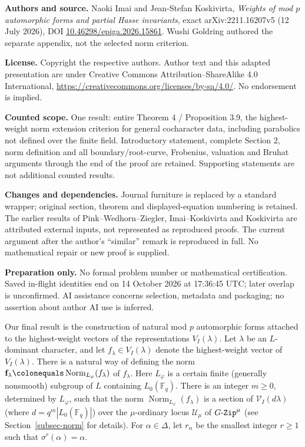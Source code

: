 \documentclass[10pt,a4paper]{article}
\numberwithin{equation}{section}
\theoremstyle{definition}
\theoremstyle{remark}
\newcommand{\GZip}{\mathop{\text{$G$-{\tt Zip}}}\nolimits}
\newcommand{\Ucal}{{\mathcal U}}
\newcommand{\Vcal}{{\mathcal V}}
\newcommand{\FF}{\mathbb{F}}
\DeclareMathOperator{\Norm}{Norm}
\begin{document}
\noindent\textbf{Authors and source.} Naoki Imai and Jean-Stefan Koskivirta, \emph{Weights of mod $p$ automorphic forms and partial Hasse invariants}, exact arXiv:2211.16207v5 (12 July 2026), DOI \href{https://doi.org/10.46298/epiga.2026.15861}{10.46298/epiga.2026.15861}. Wushi Goldring authored the separate appendix, not the selected norm criterion.
\par\noindent\textbf{License.} Copyright the respective authors. Author text and this adapted presentation are under Creative Commons Attribution--ShareAlike 4.0 International, \url{https://creativecommons.org/licenses/by-sa/4.0/}. No endorsement is implied.
\par\noindent\textbf{Counted scope.} One result: entire Theorem 4 / Proposition 3.9, the highest-weight norm extension criterion for general cocharacter data, including parabolics not defined over the finite field. Introductory statement, complete Section 2, norm definition and all boundary/root-curve, Frobenius, valuation and Bruhat arguments through the end of the proof are retained. Supporting statements are not additional counted results.
\par\noindent\textbf{Changes and dependencies.} Journal furniture is replaced by a standard wrapper; original section, theorem and displayed-equation numbering is retained. The earlier results of Pink--Wedhorn--Ziegler, Imai--Koskivirta and Koskivirta are attributed external inputs, not represented as reproduced proofs. The current argument after the author's ``similar'' remark is reproduced in full. No mathematical repair or new proof is supplied.
\par\noindent\textbf{Preparation only.} No formal problem number or mathematical certification. Saved in-flight identities end on 14 October 2026 at 17:36:45 UTC; later overlap is unconfirmed. AI assistance concerns selection, metadata and packaging; no assertion about author AI use is inferred.

\setcounter{section}{1}\setcounter{thmIntro}{3}


Our final result is the construction of natural mod $p$ automorphic forms attached to the highest-weight vectors of the representations $V_I(\lambda)$. Let $\lambda$ be an $L$-dominant character, and let $f_\lambda\in V_I(\lambda)$ denote the highest-weight vector of $V_I(\lambda)$. There is a natural way of defining the norm $\mathbf{f}_\lambda \colonequals \Norm_{L_\varphi}(f_\lambda)$ of $f_{\lambda}$. Here $L_\varphi$ is a certain finite (generally nonsmooth) subgroup of $L$ containing $L_0(\FF_q)$. There is an integer $m\geq 0$, determined by $L_\varphi$, such that the norm $\Norm_{L_\varphi}(f_\lambda)$ is a section of $\Vcal_I(d\lambda)$ (where $d=q^m|L_0(\FF_q)|$) over the $\mu$-ordinary locus $\Ucal_\mu$ of $\GZip^\mu$ (see Section~\ref{subsec-norm} for details). For $\alpha\in \Delta$, let $r_\alpha$ be the smallest integer $r\geq 1$ such that $\sigma^r(\alpha)=\alpha$.
\end{document}
